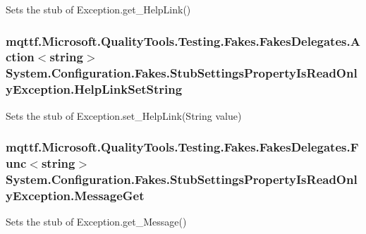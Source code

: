 Sets the stub of Exception.\-get\-\_\-\-Help\-Link()

\hypertarget{class_system_1_1_configuration_1_1_fakes_1_1_stub_settings_property_is_read_only_exception_afa45a5c6201ea832dbc161e460d202e6}{
\subsubsection[{Help\-Link\-Set\-String}]{\setlength{\rightskip}{0pt plus 5cm}mqttf.\-Microsoft.\-Quality\-Tools.\-Testing.\-Fakes.\-Fakes\-Delegates.\-Action$<$string$>$ System.\-Configuration.\-Fakes.\-Stub\-Settings\-Property\-Is\-Read\-Only\-Exception.\-Help\-Link\-Set\-String}}\label{class_system_1_1_configuration_1_1_fakes_1_1_stub_settings_property_is_read_only_exception_afa45a5c6201ea832dbc161e460d202e6}


Sets the stub of Exception.\-set\-\_\-\-Help\-Link(\-String value)

\hypertarget{class_system_1_1_configuration_1_1_fakes_1_1_stub_settings_property_is_read_only_exception_a956006b551ecb64b0dd56a1888c7bf5e}{
\subsubsection[{Message\-Get}]{\setlength{\rightskip}{0pt plus 5cm}mqttf.\-Microsoft.\-Quality\-Tools.\-Testing.\-Fakes.\-Fakes\-Delegates.\-Func$<$string$>$ System.\-Configuration.\-Fakes.\-Stub\-Settings\-Property\-Is\-Read\-Only\-Exception.\-Message\-Get}}\label{class_system_1_1_configuration_1_1_fakes_1_1_stub_settings_property_is_read_only_exception_a956006b551ecb64b0dd56a1888c7bf5e}


Sets the stub of Exception.\-get\-\_\-\-Message()

